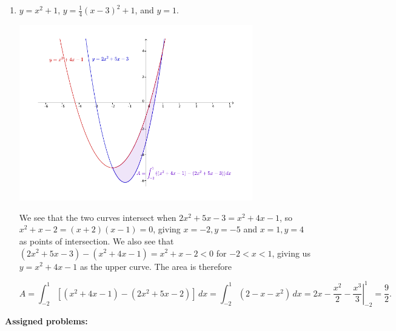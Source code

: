 \documentclass[12pt]{article}
\begin{document}
\begin{enumerate}
\begin{enumerate}
\pagebreak

   \item $y=x^2+1$, $y=\frac{1}{4}(x-3)^2+1$, and $y=1$.
   
    \begin{center}
  \includegraphics[width=0.8\textwidth]{WS4-1b}
 \end{center}
We see that the two curves intersect when $2x^2+5x-3=x^2+4x-1$, so $x^2+x-2=(x+2)(x-1)=0$, giving $x=-2, y=-5$ and $x=1, y=4$ as points of intersection. We also see that $(2x^2+5x-3)-(x^2+4x-1)=x^2+x-2<0$ for $-2<x<1$, giving us $y=x^2+4x-1$ as the upper curve. The area is therefore

\[
 A = \int_{-2}^1[(x^2+4x-1)-(2x^2+5x-2)]\,dx = \int_{-2}^1(2-x-x^2)\,dx = \left. 2x-\frac{x^2}{2}-\frac{x^3}{3}\right|_{-2}^1 = \frac{9}{2}.
\]
 \end{enumerate}

\end{enumerate}

\newpage

\textbf{Assigned problems:}
\end{document}
